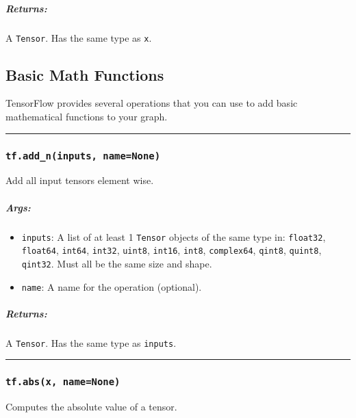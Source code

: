 \subparagraph{Returns: }\label{returns-4}

A \texttt{Tensor}. Has the same type as \texttt{x}.

\subsection{Basic Math Functions }\label{basic-math-functions}

TensorFlow provides several operations that you can use to add basic
mathematical functions to your graph.

\begin{center}\rule{0.5\linewidth}{\linethickness}\end{center}

\subsubsection{\texorpdfstring{\texttt{tf.add\_n(inputs,\ name=None)}
}{tf.add\_n(inputs, name=None) }}\label{tf.addux5fninputs-namenone}

Add all input tensors element wise.

\subparagraph{Args: }\label{args-5}

\begin{itemize}
\tightlist
\item
  \texttt{inputs}: A list of at least 1 \texttt{Tensor} objects of the
  same type in: \texttt{float32}, \texttt{float64}, \texttt{int64},
  \texttt{int32}, \texttt{uint8}, \texttt{int16}, \texttt{int8},
  \texttt{complex64}, \texttt{qint8}, \texttt{quint8}, \texttt{qint32}.
  Must all be the same size and shape.
\item
  \texttt{name}: A name for the operation (optional).
\end{itemize}

\subparagraph{Returns: }\label{returns-5}

A \texttt{Tensor}. Has the same type as \texttt{inputs}.

\begin{center}\rule{0.5\linewidth}{\linethickness}\end{center}

\subsubsection{\texorpdfstring{\texttt{tf.abs(x,\ name=None)}
}{tf.abs(x, name=None) }}\label{tf.absx-namenone}

Computes the absolute value of a tensor.

